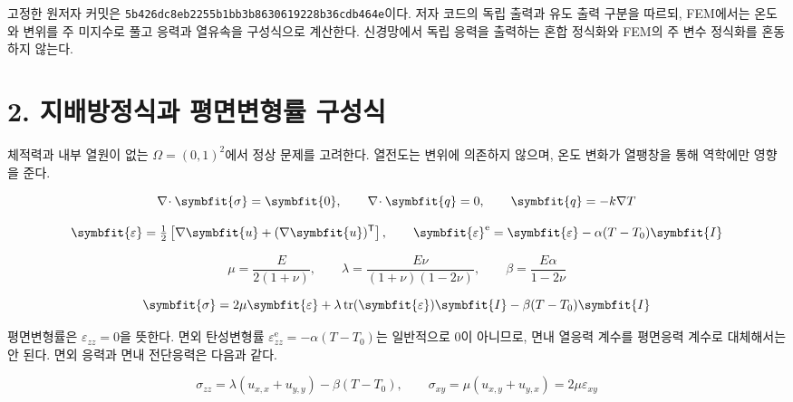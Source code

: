 \documentclass[10pt,a4paper]{article}
\renewcommand{\boldsymbol}[1]{\symbfit{#1}}
\begin{document}
고정한 원저자 커밋은 \nolinkurl{5b426dc8eb2255b1bb3b8630619228b36cdb464e}이다. 저자 코드의 독립 출력과 유도 출력 구분을 따르되, FEM에서는 온도와 변위를 주 미지수로 풀고 응력과 열유속을 구성식으로 계산한다. 신경망에서 독립 응력을 출력하는 혼합 정식화와 FEM의 주 변수 정식화를 혼동하지 않는다.\par

\clearpage

\section{2. 지배방정식과 평면변형률 구성식}

체적력과 내부 열원이 없는 $\Omega=(0,1)^2$에서 정상 문제를 고려한다. 열전도는 변위에 의존하지 않으며, 온도 변화가 열팽창을 통해 역학에만 영향을 준다.\par

\begin{equation}\nabla\!\cdot\boldsymbol\sigma=\boldsymbol0,\qquad\nabla\!\cdot\boldsymbol q=0,\qquad\boldsymbol q=-k\nabla T\end{equation}

\begin{equation}\boldsymbol\varepsilon=\tfrac12\left[\nabla\boldsymbol u+(\nabla\boldsymbol u)^{\mathsf T}\right],\qquad\boldsymbol\varepsilon^{\mathrm e}=\boldsymbol\varepsilon-\alpha(T-T_0)\boldsymbol I\end{equation}

\begin{equation}\mu=\frac{E}{2(1+\nu)},\qquad\lambda=\frac{E\nu}{(1+\nu)(1-2\nu)},\qquad\beta=\frac{E\alpha}{1-2\nu}\end{equation}

\begin{equation}\boldsymbol\sigma=2\mu\boldsymbol\varepsilon+\lambda\operatorname{tr}(\boldsymbol\varepsilon)\boldsymbol I-\beta(T-T_0)\boldsymbol I\end{equation}

평면변형률은 $\varepsilon_{zz}=0$을 뜻한다. 면외 탄성변형률 $\varepsilon^{\mathrm e}_{zz}=-\alpha(T-T_0)$는 일반적으로 0이 아니므로, 면내 열응력 계수를 평면응력 계수로 대체해서는 안 된다. 면외 응력과 면내 전단응력은 다음과 같다.\par

\begin{equation}\sigma_{zz}=\lambda(u_{x,x}+u_{y,y})-\beta(T-T_0),\qquad\sigma_{xy}=\mu(u_{x,y}+u_{y,x})=2\mu\varepsilon_{xy}\end{equation}
\end{document}

